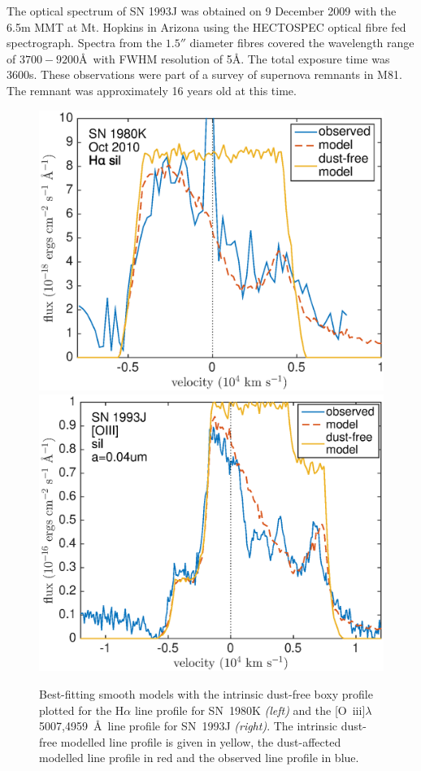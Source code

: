The optical spectrum of SN 1993J was obtained on 9 December 2009 with the 6.5m MMT at Mt. Hopkins in Arizona using the HECTOSPEC optical fibre fed spectrograph. Spectra from the $1.5''$ diameter fibres covered the wavelength range of $3700-9200$\AA\  with FWHM resolution of 5\AA.  The total exposure time was 3600s. These observations were part of a survey of supernova remnants in M81.  The remnant was approximately 16 years old at this time.
\begin{figure}
\centering
\includegraphics[clip=true,scale=0.42,trim= 20 0 50 0]{chapters/chapter6/figs/80K/smooth/Ha_with_dust_free}
\includegraphics[clip=true,scale=0.42,trim= 17 0 50 0]{chapters/chapter6/figs/93J/smooth/OIII_with_dust_free}
\caption{Best-fitting smooth models with the intrinsic dust-free boxy profile plotted for the H$\alpha$ line profile for SN~1980K {\em (left)} and the [O~{\sc iii}]$\lambda$5007,4959~\AA\ line profile for SN~1993J {\em (right)}.  The intrinsic dust-free modelled line profile is given in yellow, the dust-affected modelled line profile in red and the observed line profile in blue.}
\label{boxy}
\end{figure}
